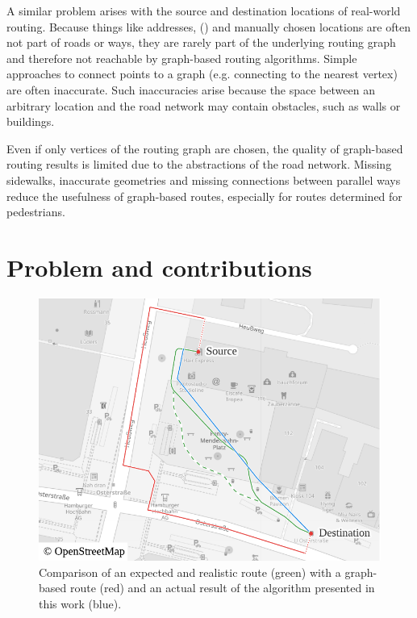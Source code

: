 	A similar problem arises with the source and destination locations of real-world routing.
	Because things like addresses,  () and manually chosen locations are often not part of roads or ways, they are rarely part of the underlying routing graph and therefore not reachable by graph-based routing algorithms.
	Simple approaches to connect points to a graph (e.g. connecting to the nearest vertex) are often inaccurate.
	Such inaccuracies arise because the space between an arbitrary location and the road network may contain obstacles, such as walls or buildings.
	
	Even if only vertices of the routing graph are chosen, the quality of graph-based routing results is limited due to the abstractions of the road network.
	Missing sidewalks, inaccurate geometries and missing connections between parallel ways reduce the usefulness of graph-based routes, especially for routes determined for pedestrians.
	
	\section{Problem and contributions}
	
	\begin{figure}
		\begin{figcenter}
			\includegraphics[width=\linewidth]{images/qgis-routing-osterstrasse}
		\end{figcenter}
		\caption[Comparison of normal routing with hybrid visibility routing.]{Comparison of an expected and realistic route (green) with a graph-based route (red) and an actual result of the algorithm presented in this work (blue).}
		\label{fig:osterstrasse-routing-vs-expected}
	\end{figure}
	

